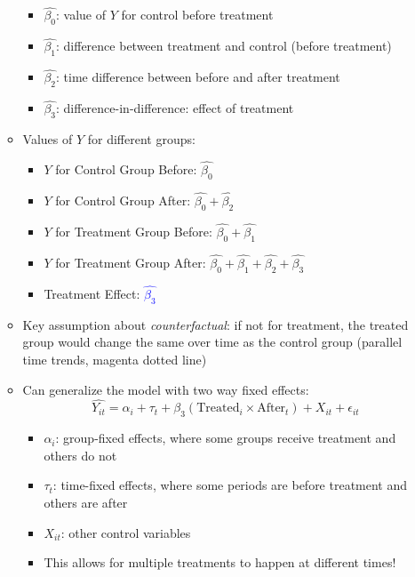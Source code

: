 \documentclass{article}
\begin{document}
\begin{itemize}
\begin{itemize}
		\begin{itemize}
			\item $\hat{\beta_0}$: value of $Y$ for control before treatment 
			\item $\hat{\beta_1}$: difference between treatment and control (before treatment)
			\item $\hat{\beta_2}$: time difference between before and after treatment
			\item $\hat{\beta_3}$: difference-in-difference: effect of treatment    
		\end{itemize}
	\item Values of $Y$ for different groups:
		\begin{itemize}
			\item $Y$ for Control Group Before: $\hat{\beta_0}$
			\item $Y$ for Control Group After: $\hat{\beta_0}+\hat{\beta_2}$
			\item $Y$ for Treatment Group Before: $\hat{\beta_0}+\hat{\beta_1}$
			\item $Y$ for Treatment Group After: $\hat{\beta_0}+\hat{\beta_1}+\hat{\beta_2}+\hat{\beta_3}$
			\item Treatment Effect: \textcolor{blue}{$\hat{\beta_3}$}
		\end{itemize}
	\item Key assumption about \emph{counterfactual}: if not for treatment, the treated group would change the same over time as the control group (parallel time trends, magenta dotted line)
	\item Can generalize the model with  two way fixed effects: 
	\begin{equation*}
\widehat{Y_{it}}=\alpha_i +\tau_t+\beta_3 (\text{Treated}_i \times \text{After}_{t})+ X_{it}+\epsilon_{it}	
\end{equation*}
	\begin{itemize}
		\item $\alpha_i$: group-fixed effects, where some groups receive treatment and others do not
		\item $\tau_t$: time-fixed effects, where some periods are before treatment and others are after
		\item $X_{it}$: other control variables 
		\item This allows for multiple treatments to happen at different times! 
	\end{itemize}
\end{itemize}
\end{itemize}
\end{document}
